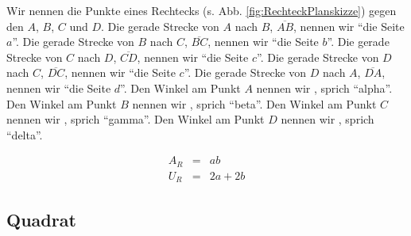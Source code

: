\documentclass[a4paper]{book}%
\theoremstyle{definition}
\begin{document}
Wir nennen die Punkte eines Rechtecks (s. Abb. \ref{fig:RechteckPlanskizze}) gegen den  $A$, $B$, $C$ und $D$. Die gerade Strecke von $A$ nach $B$, $\overline{AB}$, nennen wir \enquote{die Seite $a$}. Die gerade Strecke von $B$ nach $C$, $\overline{BC}$, nennen wir \enquote{die Seite $b$}. Die gerade Strecke von $C$ nach $D$, $\overline{CD}$, nennen wir \enquote{die Seite $c$}. Die gerade Strecke von $D$ nach $C$, $\overline{DC}$, nennen wir \enquote{die Seite $c$}. Die gerade Strecke von $D$ nach $A$, $\overline{DA}$, nennen wir \enquote{die Seite $d$}. Den Winkel am Punkt $A$ nennen wir , sprich \enquote{alpha}. Den Winkel am Punkt $B$ nennen wir , sprich \enquote{beta}. Den Winkel am Punkt $C$ nennen wir , sprich \enquote{gamma}. Den Winkel am Punkt $D$ nennen wir , sprich \enquote{delta}.

\begin{eqnarray}\label{eqn:RechteckFormeln}
    A_R &=& a b\\
    U_R &=& 2a + 2b
\end{eqnarray}


\subsection{Quadrat}
\end{document}
